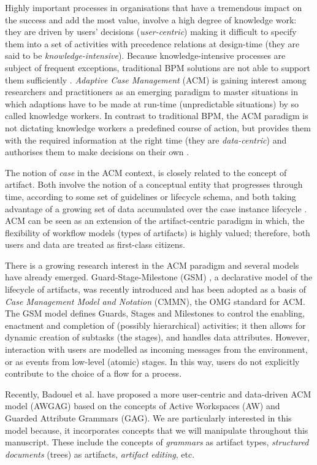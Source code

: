 Highly important processes in organisations that have a tremendous impact on the success and add the most value, involve a high degree of knowledge work: they are driven by users' decisions (\textit{user-centric}) making it difficult to specify them into a set of activities with precedence relations at design-time (they are said to be \textit{knowledge-intensive}). Because knowledge-intensive processes are subject of frequent exceptions, traditional BPM solutions are not able to support them sufficiently \cite{hauder2014research}. \textit{Adaptive Case Management} (ACM) is gaining interest among researchers and practitioners as an  emerging paradigm to master situations in which adaptions have to be made at run-time (unpredictable situations) by so called knowledge workers. In contrast to traditional BPM, the ACM paradigm is not dictating knowledge workers a predefined course of action, but provides them with the required information at the right time (they are \textit{data-centric}) and authorises them to make decisions on their own \cite{hauder2014research}. 

The notion of \textit{case} in the ACM context, is closely related to the concept of artifact. Both involve the notion of a conceptual entity that progresses through time, according to some set of guidelines or lifecycle schema, and both taking advantage of a growing set of data accumulated over the case instance lifecycle \cite{hull2013data}. ACM can be seen as an extension of the artifact-centric paradigm in which, the flexibility of workflow models (types of artifacts) is highly valued; therefore, both users and data are treated as first-class citizens.

There is a growing research interest in the ACM paradigm and several models have already emerged. Guard-Stage-Milestone (GSM) \cite{hull2011business, damaggio2013equivalence}, a declarative model of the lifecycle of artifacts, was recently introduced and has been adopted as a basis of \textit{Case Management Model and Notation} (CMMN), the OMG standard for ACM. The GSM model defines Guards, Stages and Milestones to control the enabling, enactment and completion of (possibly hierarchical) activities; it then allows for dynamic creation of subtasks (the stages), and handles data attributes. However, interaction with users are modelled as incoming messages from the environment, or as events from low-level (atomic) stages. In this way, users do not explicitly contribute to the choice of a flow for a process.

Recently, Badouel et al. \citeyearpar{badouel14, badouel2015active} have proposed a more user-centric and data-driven ACM model (AWGAG) based on the concepts of Active Workspaces (AW) and Guarded Attribute Grammars (GAG). We are particularly interested in this model because, it incorporates concepts that we will manipulate throughout this manuscript. These include the concepts of \textit{grammars} as artifact types, \textit{structured documents} (trees) as artifacts, \textit{artifact editing}, etc.

